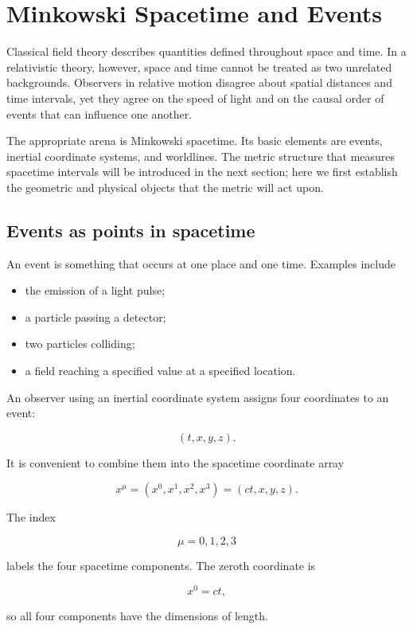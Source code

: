 \section{Minkowski Spacetime and Events}
\label{sec:minkowski_spacetime_and_events}

Classical field theory describes quantities defined throughout space and time. In a relativistic theory, however, space and time cannot be treated as two unrelated backgrounds. Observers in relative motion disagree about spatial distances and time intervals, yet they agree on the speed of light and on the causal order of events that can influence one another.

The appropriate arena is Minkowski spacetime. Its basic elements are events, inertial coordinate systems, and worldlines. The metric structure that measures spacetime intervals will be introduced in the next section; here we first establish the geometric and physical objects that the metric will act upon.

\subsection{Events as points in spacetime}

An event is something that occurs at one place and one time. Examples include

\begin{itemize}
    \item the emission of a light pulse;
    \item a particle passing a detector;
    \item two particles colliding;
    \item a field reaching a specified value at a specified location.
\end{itemize}

An observer using an inertial coordinate system assigns four coordinates to an event:

\[
(t,x,y,z).
\]

It is convenient to combine them into the spacetime coordinate array

\[
\boxed{
x^{\mu}
=
(x^{0},x^{1},x^{2},x^{3})
=
(ct,x,y,z)
}.
\]

The index

\[
\mu=0,1,2,3
\]

labels the four spacetime components. The zeroth coordinate is

\[
x^{0}=ct,
\]

so all four components have the dimensions of length.


